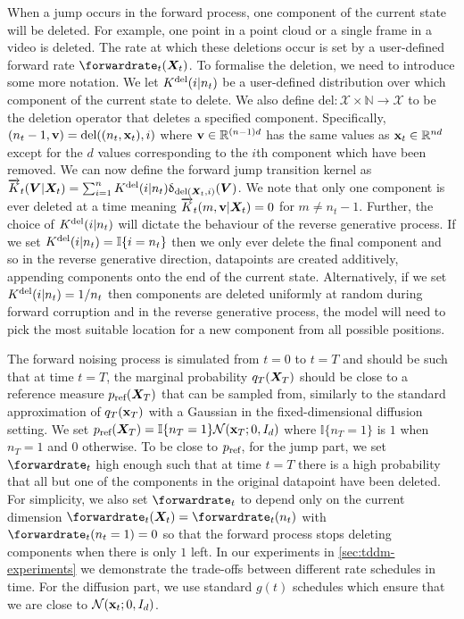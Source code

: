 When a jump occurs in the forward process, one component of the current state will be deleted.
For example, one point in a point cloud or a single frame in a video is deleted. The rate at which these deletions occur is set by a user-defined forward rate $\smash{\forwardrate_t}(\mX_t)$. To formalise the deletion, we need to introduce some more notation. We let $K^{\textup{del}}(i | n_t)$ be a user-defined distribution over which component of the current state to delete. We also define $\text{del}: \mathcal{X} \times \mathbb{N} \rightarrow \mathcal{X}$ to be the deletion operator that deletes a specified component. Specifically, $(n_t-1, {\mathbf{v}}) = \text{del}((n_t, {\mathbf{x}}_t), i)$ where ${\mathbf{v}} \in \mathbb{R}^{(n-1)d}$ has the same values as ${\mathbf{x}}_t \in \mathbb{R}^{nd}$ except for the $d$ values corresponding to the $i$th component which have been removed. 
We can now define the forward jump transition kernel as $\overrightarrow{K}_t({\bm{V}} | {\bm{X}}_t) = \sum_{i=1}^n K^{\textup{del}} (i | n_t) \updelta_{\text{del}({\bm{X}}_t, i)}({\bm{V}})$. We note that only one
component is ever deleted at a time meaning $\overrightarrow{K}_t(m, {\mathbf{v}} | {\bm{X}}_t) = 0$ for $m \neq n_t - 1$. Further, the choice of $K^{\textup{del}}(i | n_t)$ will dictate the behaviour of the reverse generative process. If we set $K^{\textup{del}}(i | n_t) = \mathbb{I}\{i=n_t\}$ then we only ever delete the final component and so in the reverse generative direction, datapoints are created additively, appending components onto the end of the current state. Alternatively, if we set $K^{\textup{del}}(i | n_t) = 1/n_t$ then components are deleted uniformly at random during forward corruption and in the reverse generative process, the model will need to pick the most suitable location for a new component from all possible positions.

The forward noising process is simulated from $t=0$ to $t=T$ and should be such that at time $t=T$, the marginal probability $q_T({\bm{X}}_T)$ should be close to a reference measure $p_{\textup{ref}}({\bm{X}}_T)$ that can be sampled from, similarly to the standard approximation of $q_T({\mathbf{x}}_T)$ with a Gaussian in the fixed-dimensional diffusion setting. 
We set $p_{\textup{ref}}({\bm{X}}_T) = \mathbb{I} \{ n_T = 1\} \mathcal{N}({\mathbf{x}}_T; 0, I_{d})$ where $\mathbb{I} \{ n_T = 1\}$ is $1$ when $n_T=1$ and $0$ otherwise. To be close to $p_{\textup{ref}}$, for the jump part, we set $\forwardrate_t$ high enough such that at time $t=T$ there is a high probability that all but one of the components in the original datapoint have been deleted. For simplicity, we also set $\forwardrate_t$ to depend only on the current dimension $\forwardrate_t(\mX_t) = \forwardrate_t(n_t)$ with $\forwardrate_t(n_t=1) = 0$ so that the forward process stops deleting components when there is only $1$ left. In our experiments in \cref{sec:tddm-experiments} we demonstrate the trade-offs between different rate schedules in time. For the diffusion part, we use standard $g(t)$ schedules which ensure that we are close to $\mathcal{N}({\mathbf{x}}_t; 0, I_{d})$.

